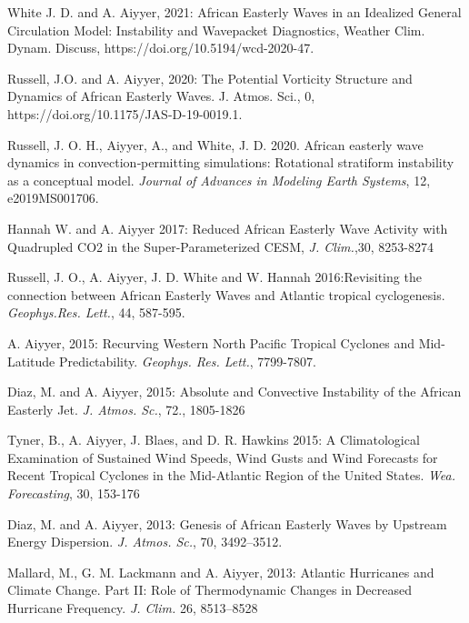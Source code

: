 \begin{ilist}
\item White J. D. and A. Aiyyer, 2021: African Easterly Waves in an Idealized General Circulation Model: Instability and Wavepacket Diagnostics, Weather Clim. Dynam. Discuss, https://doi.org/10.5194/wcd-2020-47.
 
\item Russell, J.O. and A. Aiyyer, 2020: The Potential Vorticity Structure and Dynamics of African Easterly Waves. J. Atmos. Sci., 0, https://doi.org/10.1175/JAS-D-19-0019.1.

\item Russell, J. O. H., Aiyyer, A., and White, J. D. 2020. African easterly wave dynamics in convection‐permitting simulations: Rotational stratiform instability as a conceptual model. \emph{Journal of Advances in Modeling Earth Systems}, 12, e2019MS001706.
  
\item Hannah W. and A. Aiyyer 2017: Reduced African Easterly Wave Activity with Quadrupled
  CO2 in the Super-Parameterized CESM, \emph{J. Clim.},30, 8253-8274

\item Russell, J. O., A. Aiyyer, J. D. White and W. Hannah 2016:Revisiting the connection between African Easterly Waves and Atlantic tropical cyclogenesis.  \emph{Geophys.Res. Lett.}, 44, 587-595.

\item A. Aiyyer, 2015: Recurving Western North Pacific Tropical Cyclones and Mid-Latitude Predictability. \emph{Geophys. Res. Lett.}, 7799-7807.

\item Diaz, M. and A. Aiyyer, 2015: Absolute and Convective Instability of the African Easterly Jet. \emph{J. Atmos. Sc.}, 72., 1805-1826
  
\item Tyner, B., A. Aiyyer, J. Blaes, and D. R. Hawkins 2015: A Climatological Examination of
Sustained Wind Speeds, Wind Gusts and Wind Forecasts for Recent Tropical Cyclones in the
Mid-Atlantic Region of the United States. \emph{Wea. Forecasting}, 30, 153-176


\item Diaz, M. and A. Aiyyer, 2013: Genesis of African Easterly Waves by Upstream Energy Dispersion. \emph{J. Atmos. Sc.}, 70, 3492–3512. 

\item Mallard, M., G. M. Lackmann and A. Aiyyer, 2013: Atlantic Hurricanes and Climate Change. Part II: Role of Thermodynamic Changes in Decreased Hurricane Frequency. \emph{J. Clim.} 26, 8513–8528


\end{ilist}
